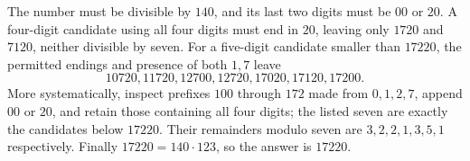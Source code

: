 The number must be divisible by $140$, and its last two digits must be $00$ or $20$. A four-digit candidate using all four digits must end in $20$, leaving only $1720$ and $7120$, neither divisible by seven. For a five-digit candidate smaller than $17220$, the permitted endings and presence of both $1,7$ leave
\[10720,11720,12700,12720,17020,17120,17200.\]
More systematically, inspect prefixes $100$ through $172$ made from $0,1,2,7$, append $00$ or $20$, and retain those containing all four digits; the listed seven are exactly the candidates below $17220$. Their remainders modulo seven are $3,2,2,1,3,5,1$ respectively. Finally $17220=140\cdot123$, so the answer is $\boxed{17220}$.
